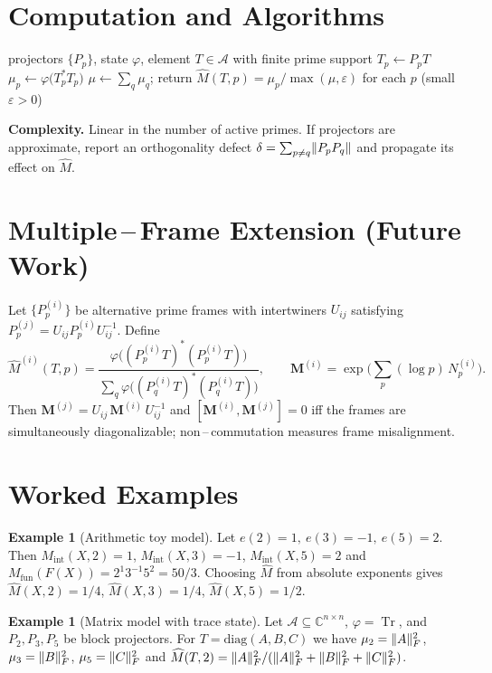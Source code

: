 \documentclass[11pt]{article}
\theoremstyle{definition}
\newtheorem{example}[definition]{Example}
\theoremstyle{plain}
\theoremstyle{remark}
\newcommand{\A}{\mathcal{A}}
\newcommand{\Cbb}{\mathbb{C}}
\newcommand{\Mfun}{M_{\mathrm{fun}}}
\newcommand{\Mint}{M_{\mathrm{int}}}
\newcommand{\Mhat}{\widehat{M}}
\DeclareMathOperator{\Tr}{Tr}
\DeclarePairedDelimiter{\norm}{\lVert}{\rVert}
\begin{document}
\section{Computation and Algorithms}
\begin{algorithm}[H]
\caption{Normalized sector weights $\Mhat(T,p)$}
\label{alg:weights}
\begin{algorithmic}[1]
\Require projectors $\{P_p\}$, state $\varphi$, element $T\in\A$ with finite prime support
  \State $T_p\gets P_p T$
  \State $\mu_p\gets \varphi\big(T_p^{*}T_p\big)$
\EndFor
\State $\mu\gets \sum_q \mu_q$; return $\Mhat(T,p)=\mu_p/\max(\mu,\varepsilon)$ for each $p$ (small $\varepsilon>0$)
\end{algorithmic}
\end{algorithm}
\noindent\textbf{Complexity.} Linear in the number of active primes. If projectors are approximate, report an orthogonality defect $\delta=\sum_{p\ne q}\norm{P_pP_q}$ and propagate its effect on $\Mhat$.

\section{Multiple\,–\,Frame Extension (Future Work)}
Let $\{P_p^{(i)}\}$ be alternative prime frames with intertwiners $U_{ij}$ satisfying $P_p^{(j)}=U_{ij}P_p^{(i)}U_{ij}^{-1}$. Define
\begin{equation}
\Mhat^{(i)}(T,p)=\frac{\varphi\big((P_p^{(i)}T)^{*}(P_p^{(i)}T)\big)}{\sum_q\varphi\big((P_q^{(i)}T)^{*}(P_q^{(i)}T)\big)},\qquad \mathbf M^{(i)}=\exp\Big(\sum_p (\log p)\,N_p^{(i)}\Big).
\end{equation}
Then $\mathbf M^{(j)}=U_{ij}\,\mathbf M^{(i)}\,U_{ij}^{-1}$ and $[\mathbf M^{(i)},\mathbf M^{(j)}]=0$ iff the frames are simultaneously diagonalizable; non\,–\,commutation measures frame misalignment.

\section{Worked Examples}
\begin{example}[Arithmetic toy model]
Let $e(2)=1,\ e(3)=-1,\ e(5)=2$. Then $\Mint(X,2)=1$, $\Mint(X,3)=-1$, $\Mint(X,5)=2$ and $\Mfun(F(X))=2^{1}3^{-1}5^{2}=50/3$. Choosing $\Mhat$ from absolute exponents gives $\Mhat(X,2)=1/4$, $\Mhat(X,3)=1/4$, $\Mhat(X,5)=1/2$.
\end{example}
\begin{example}[Matrix model with trace state]
Let $\A\subseteq \Cbb^{n\times n}$, $\varphi=\Tr$, and $P_2,P_3,P_5$ be block projectors. For $T=\mathrm{diag}(A,B,C)$ we have $\mu_2=\norm{A}_F^2$, $\mu_3=\norm{B}_F^2$, $\mu_5=\norm{C}_F^2$ and $\Mhat(T,2)=\norm{A}_F^2/(\norm{A}_F^2+\norm{B}_F^2+\norm{C}_F^2)$.
\end{example}
\end{document}
